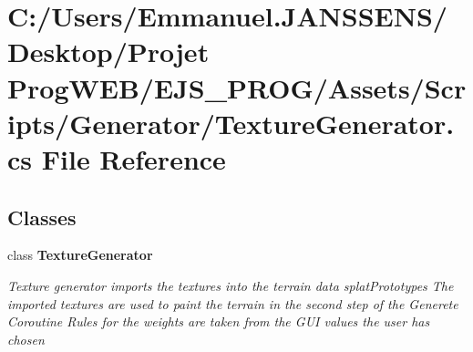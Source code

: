 \section{C\+:/\+Users/\+Emmanuel.J\+A\+N\+S\+S\+E\+N\+S/\+Desktop/\+Projet Prog\+W\+E\+B/\+E\+J\+S\+\_\+\+P\+R\+O\+G/\+Assets/\+Scripts/\+Generator/\+Texture\+Generator.cs File Reference}
\label{_texture_generator_8cs}
\subsection*{Classes}
\begin{DoxyCompactItemize}
\item 
class \textbf{ Texture\+Generator}
\begin{DoxyCompactList}\small\item\em Texture generator imports the textures into the terrain data splat\+Prototypes The imported textures are used to paint the terrain in the second step of the Generete Coroutine Rules for the weights are taken from the G\+UI values the user has chosen \end{DoxyCompactList}\end{DoxyCompactItemize}
